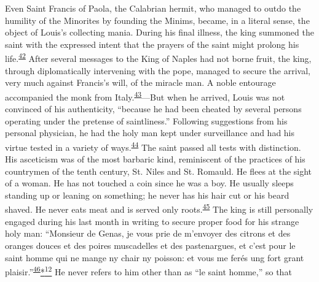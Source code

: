 Even Saint Francis of Paola, the Calabrian hermit, who managed to outdo
the humility of the Minorites by founding the Minims, became, in a
literal sense, the object of Louis's collecting mania. During his final
illness, the king summoned the saint with the expressed intent that the
prayers of the saint might prolong his
life.\textsuperscript{\protect\hypertarget{14_Chapter_Seven__THE_PIOUS_PERSONA.xhtmlux5cux23id_941}{\protect\hyperlink{23_NOTES.xhtmlux5cux23id_942}{42}}}
After several messages to the King of Naples had not borne fruit, the
king, through diplomatically intervening with the pope, managed to
secure the arrival, very much against Francis's will, of the miracle
man. A noble entourage accompanied the monk from
Italy.\textsuperscript{\protect\hypertarget{14_Chapter_Seven__THE_PIOUS_PERSONA.xhtmlux5cux23id_939}{\protect\hyperlink{23_NOTES.xhtmlux5cux23id_940}{43}}}---But
when he arrived, Louis was not convinced of his authenticity, ``because
he had been cheated by several persons operating under the pretense of
saintliness.'' Following suggestions from his personal physician, he had
the holy man kept under surveillance and had his virtue tested in a
variety of
ways.\textsuperscript{\protect\hypertarget{14_Chapter_Seven__THE_PIOUS_PERSONA.xhtmlux5cux23id_937}{\protect\hyperlink{23_NOTES.xhtmlux5cux23id_938}{44}}}
The saint passed all tests with distinction. His asceticism was of the
most barbaric kind, reminiscent of the practices of his countrymen of
the tenth century, St. Niles and St. Romauld. He flees at the sight of a
woman. He has not touched a coin since he was a boy. He usually sleeps
standing up or leaning on something; he never has his hair cut or his
beard shaved. He never eats meat and is served only
roots.\textsuperscript{\protect\hypertarget{14_Chapter_Seven__THE_PIOUS_PERSONA.xhtmlux5cux23id_935}{\protect\hyperlink{23_NOTES.xhtmlux5cux23id_936}{45}}}
The king is still personally engaged during his last month in writing to
secure proper food for his strange holy man: ``Monsieur de Genas, je
vous prie de m'envoyer des citrons et des oranges douces et des poires
muscadelles et des pastenargues, et c'est pour le saint homme qui ne
mange ny chair ny poisson: et vous me ferés ung fort grant
plaisir.''\textsuperscript{\protect\hypertarget{14_Chapter_Seven__THE_PIOUS_PERSONA.xhtmlux5cux23id_933}{\protect\hyperlink{23_NOTES.xhtmlux5cux23id_934}{46}}}\protect\hypertarget{14_Chapter_Seven__THE_PIOUS_PERSONA.xhtmlux5cux23id_2319}{\protect\hyperlink{23_NOTES.xhtmlux5cux23id_2320}{*\textsuperscript{12}}}
He never refers to him other than as ``le saint homme,'' so that
